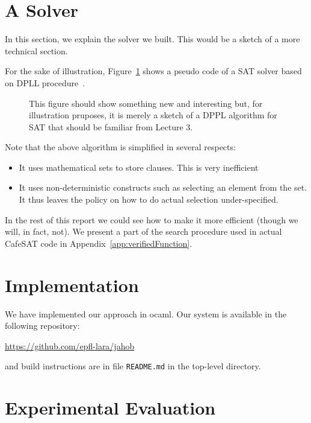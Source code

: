 \documentclass[a4paper,UKenglish,cleveref, autoref, thm-restate]{lipics-v2021}
\begin{document}
\section{A Solver}

In this section, we explain the solver we built.
This would be a sketch of a more technical section.

For the sake of illustration, Figure~\ref{fig:dpll} shows a
pseudo code of a SAT solver based on DPLL
procedure~\cite{10.1145/321033.321034}.
\begin{figure}
  \newcommand{\BB}{Bool} %
  \caption{This figure should show something new and interesting but, for illustration pruposes, it is merely a sketch
    of a DPPL algorithm for SAT that should be familiar from Lecture 3.\label{fig:dpll}}  
\end{figure}

Note that the above algorithm is simplified in several respects:
\begin{itemize}
\item It uses mathematical sets to store clauses. This is very inefficient
\item It uses non-deterministic constructs such as selecting an element from the set. It thus leaves the policy on how to do actual selection under-specified.
\end{itemize}
In the rest of this report we could see how to make it more efficient (though we will, in fact, not).
We present a part of the search procedure used in actual CafeSAT code in Appendix~\ref{app:verifiedFunction}.

\section{Implementation}

We have implemented our approach in ocaml. Our system is available in the following repository:
\begin{center}
  \url{https://github.com/epfl-lara/jahob}
\end{center}
and build instructions are in file \verb|README.md| in the top-level directory.

\section{Experimental Evaluation}
\end{document}
